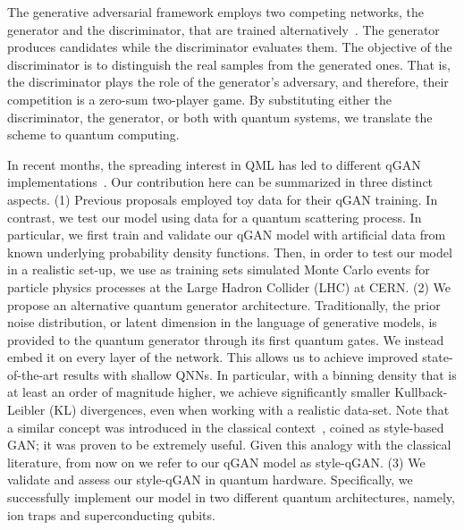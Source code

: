 \documentclass[twocolumn,preprintnumbers,superscriptaddress]{revtex4-2}
\begin{document}
The generative adversarial framework employs two competing networks, the generator and the discriminator, that are
trained alternatively~\cite{goodfellow2014generative}. The generator produces candidates
while the discriminator evaluates them. The objective of the discriminator is to
distinguish the real samples from the generated ones. That is, the discriminator
plays the role of the generator's adversary, and therefore, their competition is
a zero-sum two-player game. By substituting either the discriminator, the
generator, or both with quantum systems, we translate the scheme to quantum
computing.

In recent months, the spreading interest in QML has led to different qGAN
implementations~\cite{zoufal2019quantum, zeng2019learning, situ2020quantum, hu2019quantum, benedetti2019adversarial, romero2021variational, niu2021entangling}. Our contribution here can be summarized in three distinct aspects. (1) Previous proposals employed toy data for their qGAN training. In contrast, we test our model using data for a quantum scattering process. In particular, we first train and validate our qGAN model with artificial data from known underlying probability density functions. Then, in order to test our model in a realistic set-up, we use as training sets simulated Monte Carlo events for particle physics processes at the Large Hadron Collider (LHC) at CERN. (2) We propose an alternative quantum generator architecture. Traditionally, the prior noise distribution, or latent dimension in the language of generative models, is provided to the quantum generator through its first quantum gates. We instead embed it on every layer of the network. This allows us to achieve improved state-of-the-art results with shallow QNNs. In particular, with a binning density that is at least an order of magnitude higher, we achieve significantly smaller Kullback-Leibler (KL) divergences, even when working with a realistic data-set. Note that a similar concept was introduced in the classical context~\cite{karras2019style}, coined as style-based GAN; it was proven to be extremely useful. Given this analogy with the classical literature, from now on we refer to our qGAN model as style-qGAN. (3) We validate and assess our style-qGAN in quantum hardware. Specifically, we successfully implement our model in two different quantum architectures, namely, ion traps and superconducting qubits.
\end{document}
